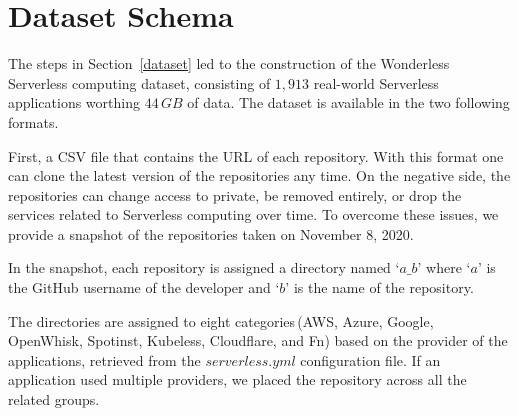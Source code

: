 
\section{Dataset Schema}
\label{schema}

The steps in Section~\ref{dataset} led to the construction of the
 Wonderless Serverless computing dataset, consisting of $1,913$
real-world Serverless applications worthing $44 \, GB$ of data. The dataset 
is available in the two following formats.

First, a CSV file that contains the URL of each repository. 
With this format one can clone the latest version of the repositories any time. 
On the negative side, the repositories can change access to private, 
be removed entirely, or drop the services related to Serverless computing 
over time. To overcome these issues, we provide a snapshot of the 
repositories taken on November 8, 2020. 

In the snapshot, each repository is assigned a directory named `$a\_b$' 
where `$a$' is the GitHub username of the developer and `$b$' is the name of the repository. 

The directories are assigned to eight categories\,(AWS, Azure, Google, OpenWhisk, Spotinst, 
Kubeless, Cloudflare, and Fn) based on the provider of the applications,
retrieved from the $serverless.yml$ configuration file. 
If an application used multiple providers, we placed the repository across 
all the related groups. 
